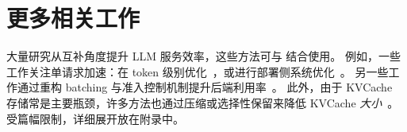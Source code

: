 \section{更多相关工作}
\label{sec:related}

大量研究从互补角度提升 LLM 服务效率，这些方法可与 \oursched 结合使用。
例如，一些工作关注单请求加速：在 token 级别优化~\cite{dao2022flashattention,dao2023flashattention,dettmers2022gpt3,frantar2022gptq,leviathan2023speculative,miao2023specinfer}，或进行部署侧系统优化~\cite{zhong2024distserve,qin2024mooncake,hu2024memserve,hu2024inference,agrawal2024taming}。
另一些工作通过重构 batching 与准入控制机制提升后端利用率~\cite{duan2024muxserve,xiang2025aegaeon}。
此外，由于 KVCache 存储常是主要瓶颈，许多方法也通过压缩或选择性保留来降低 KVCache \emph{大小}~\cite{xiao2023efficient,zhang2023h2o,lee2024infinigen}。
受篇幅限制，详细展开放在附录中。
